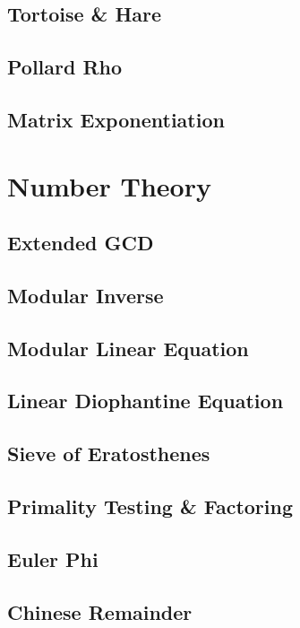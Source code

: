 		\subsection{Tortoise \& Hare}
			
		\subsection{Pollard Rho}
			
		\subsection{Matrix Exponentiation}
			
	\section{Number Theory}
		\subsection{Extended GCD}
			
		\subsection{Modular Inverse}
			
		\subsection{Modular Linear Equation}
			
		\subsection{Linear Diophantine Equation}
			
		\subsection{Sieve of Eratosthenes}
			
		\subsection{Primality Testing \& Factoring}
			
		\subsection{Euler Phi}
			
		\subsection{Chinese Remainder}
			
